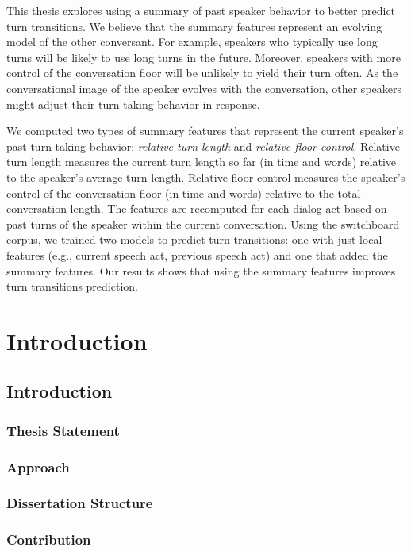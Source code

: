 \documentclass[copyright,masters]{cslu-thesis}
\begin{document}
This thesis explores using a summary of past speaker behavior to better predict turn transitions. We believe that the summary features represent an evolving model of the other conversant. For example, speakers who typically use long turns will be likely to use long turns in the future. Moreover, speakers with more control of the conversation floor will be unlikely to yield their turn often. As the conversational image of the speaker evolves with the conversation, other speakers might adjust their turn taking behavior in response.

We computed two types of summary features that represent the current speaker's past turn-taking behavior: \textit{relative turn length} and \textit{relative floor control}. Relative turn length measures the current turn length so far (in time and words) relative to the speaker's average turn length. Relative floor control measures the speaker's control of the conversation floor (in time and words) relative to the total conversation length. The features are recomputed for each dialog act based on past turns of the speaker within the current conversation. Using the switchboard corpus, we trained two models to predict turn transitions: one with just local features (e.g., current speech act, previous speech act) and one that added the summary features. Our results shows that using the summary features improves turn transitions prediction.
\body


\part{Introduction} %

\chapter{Introduction}

\section{Thesis Statement}

\section{Approach}

\section{Dissertation Structure}

\section{Contribution}

\end{document}
